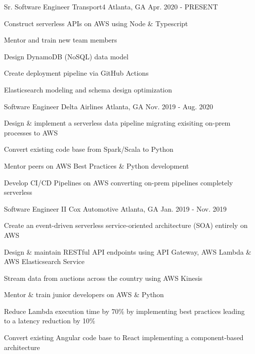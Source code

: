 
\begin{cventries}
  \cventry
    {Sr. Software Engineer} %
    {Transport4} %
    {Atlanta, GA} %
    {Apr. 2020 - PRESENT} %
    {
      \begin{cvitems} %
        \item {Construct serverless APIs on AWS using Node \& Typescript}
        \item {Mentor and train new team members}
        \item {Design DynamoDB (NoSQL) data model}
        \item {Create deployment pipeline via GitHub Actions}
        \item {Elasticsearch modeling and schema design optimization}
      \end{cvitems}
    }
    
  \cventry
    {Software Engineer} %
    {Delta Airlines} %
    {Atlanta, GA} %
    {Nov. 2019 - Aug. 2020} %
    {
      \begin{cvitems} %
        \item {Design \& implement a serverless data pipeline migrating exisiting on-prem processes to AWS}
        \item {Convert existing code base from Spark/Scala to Python}
        \item {Mentor peers on AWS Best Practices \& Python development}
        \item {Develop CI/CD Pipelines on AWS converting on-prem pipelines completely serverless}
      \end{cvitems}
    }

  \cventry
    {Software Engineer II} %
    {Cox Automotive} %
    {Atlanta, GA} %
    {Jan. 2019 - Nov. 2019} %
    {
      \begin{cvitems} %
        \item {Create an event-driven serverless service-oriented architecture (SOA) entirely on AWS}
        \item {Design \& maintain RESTful API endpoints using API Gateway, AWS Lambda \& AWS Elasticsearch Service}
        \item {Stream data from auctions across the country using AWS Kinesis}
        \item {Mentor \& train junior developers on AWS \& Python}
        \item {Reduce Lambda execution time by 70\% by implementing best practices leading to a latency reduction by 10\%}
        \item {Convert existing Angular code base to React implementing a component-based architecture}
      \end{cvitems}
    }


\end{cventries}
